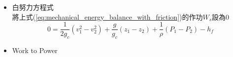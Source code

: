 \documentclass[../main.tex]{subfiles}
\begin{document}
\begin{itemize}
\begin{itemize}
\begin{equation}
      \underbrace{w_s}_{\text{系統對外做軸功}} = \underbrace{\frac{1}{2g_c} \left(
        v_1^2 - v_2^2
      \right)}_{\text{動能減少}} + \underbrace{\frac{g}{g_c}(z_1 - z_2)}_{\text{位能減少}} + 
      \underbrace{\frac{1}{\rho} (P_1 - P_2)}_{\text{壓力能減少}} - 
      \underbrace{h_f}_{\text{摩擦損失能量}} \label{eq:mechanical_energy_balance_with_friction}
    \end{equation}
    單位:
    \begin{equation}
      [=]\quad \left(\frac{J}{kg}\right) = \left(
        \frac{m^2}{s^2}
      \right) = \left(
        \frac{\text{lb}_f\cdot ft}{\text{lb}_m}
      \right)
    \end{equation}
    來自熱力學第一定律，開放系統:\\
    注意單位用J/kg
    \begin{align}
      &\Delta H + \frac{\Delta v^2}{2g_c} + \frac{g}{g_c}\Delta z = Q - W_s, \quad \Delta = \mcirc{2}-\mcirc{1} \\
      \text{由}&H = U + \frac{PV}{m} \nonumber\\
      \implies & \cancelto{T_2=T_1}{\Delta U } +
      \Delta \left(\frac{PV}{m}\right) + \frac{\Delta v^2}{2g_c} + \frac{g}{g_c}\Delta z = 
      \cancelto{\text{絕熱}}{Q} - W_s \nonumber\\
      \implies & W_s = -\frac{\Delta v^2}{2g_c} - \frac{g}{g_c}\Delta z -
       \Delta \left(\frac{PV}{m}\right) \nonumber\\
       \implies & W_s = -\frac{\Delta v^2}{2g_c} - \frac{g}{g_c}\Delta z -
       \Delta \left(\frac{P}{\rho}\right) \nonumber\\
       \text{不可壓縮}\implies & \phantom{ W_s} = -\frac{\Delta v^2}{2g_c} - \frac{g}{g_c}\Delta z -
        \frac{1}{\rho}\Delta P \nonumber\\
      \implies & W_s = \frac{1}{2g_c} \left(
        v_1^2 - v_2^2
      \right) + \frac{g}{g_c}(z_1 - z_2) + 
      \frac{1}{\rho} (P_1 - P_2)
    \end{align}
    而當考慮摩擦損失能量時，就在最後面再多扣一項$h_f$即可
    \item 白努力方程式\\
    將上式(\ref{eq:mechanical_energy_balance_with_friction})的作功$W_s$設為0
    \begin{equation}
      0 = \frac{1}{2g_c} \left(
        v_1^2 - v_2^2
      \right) + \frac{g}{g_c}(z_1 - z_2) + 
      \frac{1}{\rho} (P_1 - P_2) - 
      h_f
    \end{equation}
    \item Work to Power\\

\end{itemize}
\end{itemize}
\end{document}
